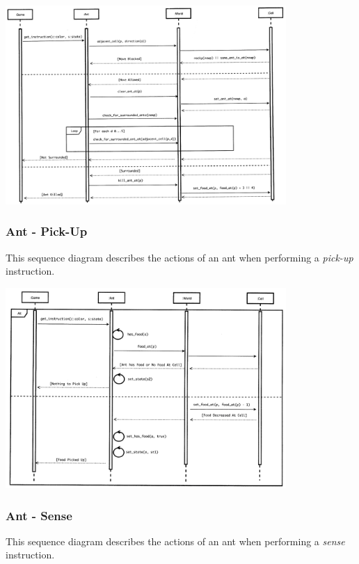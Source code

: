 \documentclass[11pt]{article}
\begin{document}
\begin{center}
\includegraphics[width=0.8\textwidth]{low-level-diagrams/sequence/ant-move.png}
\end{center}

\subsubsection{Ant - Pick-Up}

This sequence diagram describes the actions of an ant when performing a \textit{pick-up} instruction.

\begin{center}
\includegraphics[width=0.8\textwidth]{low-level-diagrams/sequence/ant-pickup.png}
\end{center}

\subsubsection{Ant - Sense}

This sequence diagram describes the actions of an ant when performing a \textit{sense} instruction.
\end{document}
